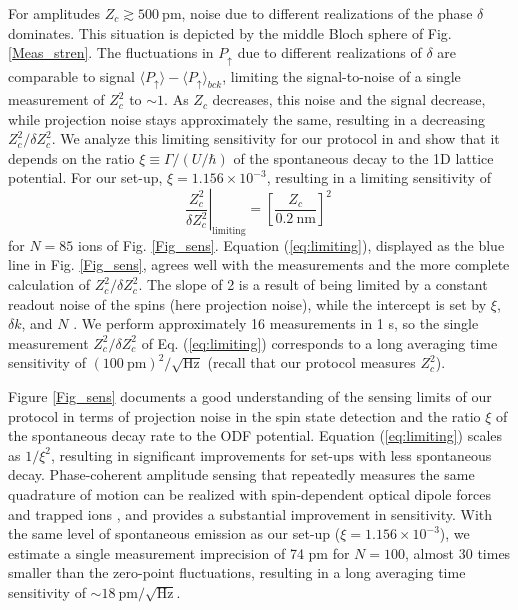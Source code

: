 \documentclass[aps,prl,twocolumn,superscriptaddress,floatfix]{revtex4-1}
\begin{document}
For amplitudes $Z_{c}\gtrsim 500\:\mathrm{pm}$, noise due to different realizations of the phase $\delta$ dominates. This situation is depicted by the middle Bloch sphere of Fig. \ref{Meas_stren}. The fluctuations in $P_{\uparrow}$ due to different realizations of $\delta$ are comparable to signal $\langle P_{\uparrow}\rangle - \langle P_{\uparrow} \rangle_{bck}$, limiting the signal-to-noise of a single measurement of $Z_{c}^{2}$
to $\sim1$. As $Z_{c}$ decreases, this noise and the signal
decrease, while projection noise stays approximately the same, resulting
in a decreasing $Z_{c}^{2}/\delta Z_{c}^{2}$. We analyze this limiting sensitivity for our protocol in \citep{SuppMat} and show that
it depends on the ratio $\xi\equiv\Gamma/\left(U/\hbar\right)$ of the spontaneous decay to the 1D lattice potential. For
our set-up, $\xi=1.156\times10^{-3}$, resulting in a limiting sensitivity
of 
\begin{equation}
\left.\frac{Z_{c}^{2}}{\delta Z_{c}^{2}}\right|_{\mathrm{limiting}}=\left[\frac{Z_{c}}{0.2\:\mathrm{nm}}\right]^{2}\:\label{eq:limiting}
\end{equation}
for $N=85$ ions of Fig. \ref{Fig_sens}. Equation (\ref{eq:limiting}), displayed as the blue line in Fig. \ref{Fig_sens}, agrees well with the measurements and the more complete calculation of ${Z_{c}^{2}}/{\delta Z_{c}^{2}}$. The slope of 2 is a result of being limited by a constant readout noise of the spins (here projection noise), while the intercept is set by $\xi$, $\delta k$, and $N$ \citep{SuppMat}. We perform approximately 16 measurements in 1 s, so the single measurement ${Z_{c}^{2}}/{\delta Z_{c}^{2}}$
of Eq. (\ref{eq:limiting}) corresponds to a long averaging time sensitivity of $\left(100\:\mathrm{pm}\right)^{2}/\sqrt{\mathrm{Hz}}$ (recall that our protocol measures $Z_{c}^2$).

Figure \ref{Fig_sens} documents a good understanding of the sensing limits
of our protocol in terms of projection noise in the spin state detection
and the ratio $\xi$ of the spontaneous decay rate to the ODF potential.
Equation (\ref{eq:limiting}) scales as $1/\xi^{2}$, resulting in
significant improvements for set-ups with less spontaneous decay.
Phase-coherent amplitude sensing that repeatedly measures the same quadrature of motion can be realized with spin-dependent optical dipole
forces and trapped ions \citep{Hume2011, Biercuk2011}, and provides a substantial improvement in sensitivity.
With the same level of spontaneous emission as our set-up ($\xi=1.156\times10^{-3}$), we estimate a single measurement imprecision of 74 pm for $N=100$, almost 30 times
smaller than the zero-point fluctuations, resulting in a long averaging time sensitivity of $\sim18\:\mathrm{pm/\sqrt{\mathrm{Hz}}}$. 
\end{document}
